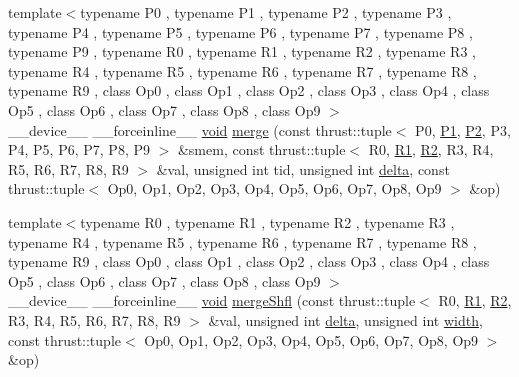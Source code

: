 \begin{DoxyCompactItemize}
{\footnotesize template$<$typename P0 , typename P1 , typename P2 , typename P3 , typename P4 , typename P5 , typename P6 , typename P7 , typename P8 , typename P9 , typename R0 , typename R1 , typename R2 , typename R3 , typename R4 , typename R5 , typename R6 , typename R7 , typename R8 , typename R9 , class Op0 , class Op1 , class Op2 , class Op3 , class Op4 , class Op5 , class Op6 , class Op7 , class Op8 , class Op9 $>$ }\\\-\_\-\-\_\-device\-\_\-\-\_\- \-\_\-\-\_\-forceinline\-\_\-\-\_\- \hyperlink{legacy_8hpp_a8bb47f092d473522721002c86c13b94e}{void} \hyperlink{namespacecv_1_1gpu_1_1device_1_1reduce__detail_a9f5d57fdb71bfb0d167fb47832a7a197}{merge} (const thrust\-::tuple$<$ P0, \hyperlink{calib3d_8hpp_a81046431a4ff9a0e8b93536f19efac38}{P1}, \hyperlink{calib3d_8hpp_a704ac1a3954b1c810117417a050e7f76}{P2}, P3, P4, P5, P6, P7, P8, P9 $>$ \&smem, const thrust\-::tuple$<$ R0, \hyperlink{calib3d_8hpp_ab4d5cbb79188a091449ea6430cd5ec59}{R1}, \hyperlink{calib3d_8hpp_a08847b11703596b1db049ef98d450eaa}{R2}, R3, R4, R5, R6, R7, R8, R9 $>$ \&val, unsigned int tid, unsigned int \hyperlink{legacy_8hpp_ac867054f00f4be8b1f3ebce6fba31982}{delta}, const thrust\-::tuple$<$ Op0, Op1, Op2, Op3, Op4, Op5, Op6, Op7, Op8, Op9 $>$ \&op)
\item 
{\footnotesize template$<$typename R0 , typename R1 , typename R2 , typename R3 , typename R4 , typename R5 , typename R6 , typename R7 , typename R8 , typename R9 , class Op0 , class Op1 , class Op2 , class Op3 , class Op4 , class Op5 , class Op6 , class Op7 , class Op8 , class Op9 $>$ }\\\-\_\-\-\_\-device\-\_\-\-\_\- \-\_\-\-\_\-forceinline\-\_\-\-\_\- \hyperlink{legacy_8hpp_a8bb47f092d473522721002c86c13b94e}{void} \hyperlink{namespacecv_1_1gpu_1_1device_1_1reduce__detail_a65e87aab1cfdbf709ae09e949d52714d}{merge\-Shfl} (const thrust\-::tuple$<$ R0, \hyperlink{calib3d_8hpp_ab4d5cbb79188a091449ea6430cd5ec59}{R1}, \hyperlink{calib3d_8hpp_a08847b11703596b1db049ef98d450eaa}{R2}, R3, R4, R5, R6, R7, R8, R9 $>$ \&val, unsigned int \hyperlink{legacy_8hpp_ac867054f00f4be8b1f3ebce6fba31982}{delta}, unsigned int \hyperlink{highgui__c_8h_a2474a5474cbff19523a51eb1de01cda4}{width}, const thrust\-::tuple$<$ Op0, Op1, Op2, Op3, Op4, Op5, Op6, Op7, Op8, Op9 $>$ \&op)
\end{DoxyCompactItemize}


